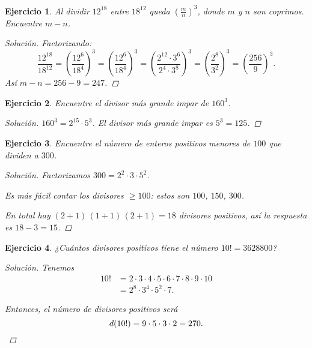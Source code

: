 \documentclass{article}
\theoremstyle{plain}
\newtheorem{ejercicio}{Ejercicio}
\newenvironment{solucion}{\begin{proof}[Solución]}{\end{proof}}
\begin{document}
\begin{ejercicio}
Al dividir $12^{18}$ entre $18^{12}$ queda $\left(\frac{m}{n}\right)^3$,
donde $m$ y $n$ son coprimos. Encuentre $m - n$.

\ifdefined\solutions
\begin{solucion}
    Factorizando:
    \[
        \frac{12^{18}}{18^{12}} =
        \left(\frac{12^6}{18^4}\right)^3 =
        \left(\frac{12^6}{18^4}\right)^3 =
        \left(\frac{2^{12}\cdot 3^6}{2^4\cdot 3^8}\right)^3 =
        \left(\frac{2^8}{3^2}\right)^3 =
        \left(\frac{256}{9}\right)^3.
    \]
    Así $m - n = 256 - 9 = 247$.
\end{solucion}
\fi
\end{ejercicio}

\pagebreak

\begin{ejercicio}
Encuentre el divisor más grande impar de $160^3$.

\ifdefined\solutions
\begin{solucion}
    $160^3 = 2^{15}\cdot 5^3$. El divisor más grande impar es $5^3 = 125$.
\end{solucion}
\fi
\end{ejercicio}

\pagebreak

\begin{ejercicio}
Encuentre el número de enteros positivos menores de $100$ que dividen a $300$.

\ifdefined\solutions
\begin{solucion}
    Factorizamos $300 = 2^2\cdot 3\cdot 5^2$.

    Es más fácil contar los divisores $\ge 100$: estos son $100$, $150$, $300$.
    
    En total hay $(2 + 1)\,(1 + 1)\,(2 + 1) = 18$ divisores positivos,
    así la respuesta es $18 - 3 = 15$.
\end{solucion}
\fi
\end{ejercicio}

\pagebreak

\begin{ejercicio}

¿Cuántos divisores positivos tiene el número
$10! = 3628800$?

\ifdefined\solutions
\begin{solucion}        
    Tenemos
    \begin{align*}
        10! & = 2\cdot 3\cdot 4\cdot 5\cdot 6\cdot 7\cdot 8\cdot 9\cdot 10 \\
            & = 2^8\cdot 3^4\cdot 5^2\cdot 7.
    \end{align*}
    
    Entonces, el número de divisores positivos será
    \[ d (10!) = 9\cdot 5\cdot 3\cdot 2 = 270. \qedhere \]
\end{solucion}
\fi
\end{ejercicio}
\end{document}
